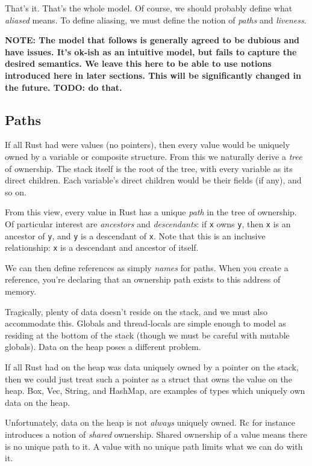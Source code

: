 \documentclass[a4paper,]{book}
\begin{document}
That's it. That's the whole model. Of course, we should probably define
what \emph{aliased} means. To define aliasing, we must define the notion
of \emph{paths} and \emph{liveness}.

\textbf{NOTE: The model that follows is generally agreed to be dubious
and have issues. It's ok-ish as an intuitive model, but fails to capture
the desired semantics. We leave this here to be able to use notions
introduced here in later sections. This will be significantly changed in
the future. TODO: do that.}

\subsection{Paths}\label{paths}

If all Rust had were values (no pointers), then every value would be
uniquely owned by a variable or composite structure. From this we
naturally derive a \emph{tree} of ownership. The stack itself is the
root of the tree, with every variable as its direct children. Each
variable's direct children would be their fields (if any), and so on.

From this view, every value in Rust has a unique \emph{path} in the tree
of ownership. Of particular interest are \emph{ancestors} and
\emph{descendants}: if \texttt{x} owns \texttt{y}, then \texttt{x} is an
ancestor of \texttt{y}, and \texttt{y} is a descendant of \texttt{x}.
Note that this is an inclusive relationship: \texttt{x} is a descendant
and ancestor of itself.

We can then define references as simply \emph{names} for paths. When you
create a reference, you're declaring that an ownership path exists to
this address of memory.

Tragically, plenty of data doesn't reside on the stack, and we must also
accommodate this. Globals and thread-locals are simple enough to model
as residing at the bottom of the stack (though we must be careful with
mutable globals). Data on the heap poses a different problem.

If all Rust had on the heap was data uniquely owned by a pointer on the
stack, then we could just treat such a pointer as a struct that owns the
value on the heap. Box, Vec, String, and HashMap, are examples of types
which uniquely own data on the heap.

Unfortunately, data on the heap is not \emph{always} uniquely owned. Rc
for instance introduces a notion of \emph{shared} ownership. Shared
ownership of a value means there is no unique path to it. A value with
no unique path limits what we can do with it.
\end{document}
